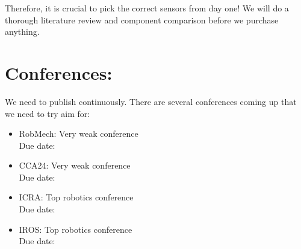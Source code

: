 	Therefore, it is crucial to pick the correct sensors from day one! We will do a thorough literature review and component comparison before we purchase anything. 


\section{Conferences:}
	We need to publish continuously. There are several conferences coming up that we need to try aim for:
	
	\begin{itemize}
		\item RobMech: Very weak conference\\
		Due date:
		\item CCA24: Very weak conference\\
		Due date: 
		\item ICRA: Top robotics conference\\
		Due date:
		\item IROS: Top robotics conference\\
		Due date:
	\end{itemize}




























